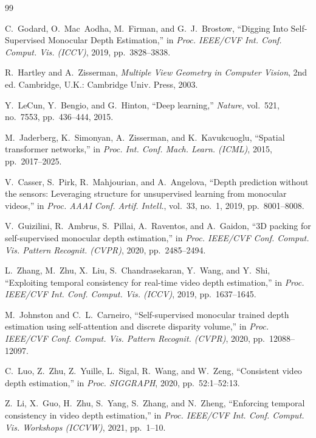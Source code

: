 \documentclass[10pt,twocolumn,letterpaper]{article}
\begin{document}
\begin{thebibliography}{99}

C.~Godard, O.~Mac~Aodha, M.~Firman, and G.~J.~Brostow, ``Digging Into Self-Supervised Monocular Depth Estimation,'' in \textit{Proc. IEEE/CVF Int. Conf. Comput. Vis. (ICCV)}, 2019, pp.~3828--3838.

R.~Hartley and A.~Zisserman, \textit{Multiple View Geometry in Computer Vision}, 2nd ed. Cambridge, U.K.: Cambridge Univ. Press, 2003.

Y.~LeCun, Y.~Bengio, and G.~Hinton, ``Deep learning,'' \textit{Nature}, vol.~521, no.~7553, pp.~436--444, 2015.

M.~Jaderberg, K.~Simonyan, A.~Zisserman, and K.~Kavukcuoglu, ``Spatial transformer networks,'' in \textit{Proc. Int. Conf. Mach. Learn. (ICML)}, 2015, pp.~2017--2025.

V.~Casser, S.~Pirk, R.~Mahjourian, and A.~Angelova, ``Depth prediction without the sensors: Leveraging structure for unsupervised learning from monocular videos,'' in \textit{Proc. AAAI Conf. Artif. Intell.}, vol.~33, no.~1, 2019, pp.~8001--8008.

V.~Guizilini, R.~Ambrus, S.~Pillai, A.~Raventos, and A.~Gaidon, ``3D packing for self-supervised monocular depth estimation,'' in \textit{Proc. IEEE/CVF Conf. Comput. Vis. Pattern Recognit. (CVPR)}, 2020, pp.~2485--2494.

L.~Zhang, M.~Zhu, X.~Liu, S.~Chandrasekaran, Y.~Wang, and Y.~Shi, ``Exploiting temporal consistency for real-time video depth estimation,'' in \textit{Proc. IEEE/CVF Int. Conf. Comput. Vis. (ICCV)}, 2019, pp.~1637--1645.

M.~Johnston and C.~L.~Carneiro, ``Self-supervised monocular trained depth estimation using self-attention and discrete disparity volume,'' in \textit{Proc. IEEE/CVF Conf. Comput. Vis. Pattern Recognit. (CVPR)}, 2020, pp.~12088--12097.

C.~Luo, Z.~Zhu, Z.~Yuille, L.~Sigal, R.~Wang, and W.~Zeng, ``Consistent video depth estimation,'' in \textit{Proc. SIGGRAPH}, 2020, pp.~52:1--52:13.

Z.~Li, X.~Guo, H.~Zhu, S.~Yang, S.~Zhang, and N.~Zheng, ``Enforcing temporal consistency in video depth estimation,'' in \textit{Proc. IEEE/CVF Int. Conf. Comput. Vis. Workshops (ICCVW)}, 2021, pp.~1--10.


\end{thebibliography}
\end{document}
